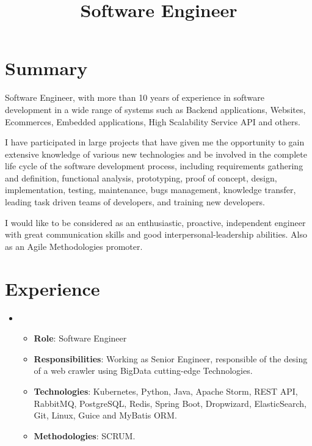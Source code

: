 \documentclass[11pt,a4paper,sans]{moderncv}        %
\title{Software Engineer}                               %
\begin{document}
\makecvtitle

\section{Summary}
Software Engineer, with more than 10 years of experience in software development in a wide range of systems 
such as Backend applications, Websites, Ecommerces, Embedded applications, High Scalability Service API and
others.

\medskip I have participated in large projects that have given me the opportunity to gain extensive knowledge of various new
technologies and be involved in the complete life cycle of the software development process, including requirements
gathering and definition, functional analysis, prototyping, proof of concept, design, implementation, testing,
maintenance, bugs management, knowledge transfer, leading task driven teams of developers, and training new
developers.

\medskip I would like to be considered as an enthusiastic, proactive, independent engineer with great communication skills
and good interpersonal-leadership abilities. Also as an Agile Methodologies promoter.

\section{Experience}
  {
    \begin{itemize}
      \item 
        \begin{itemize}
          \item \textbf{Role}: Software Engineer
          \item \textbf{Responsibilities}: Working as Senior Engineer, responsible of the desing of a web crawler using BigData cutting-edge Technologies. 
          \item \textbf{Technologies}: Kubernetes, Python, Java, Apache Storm, REST API, RabbitMQ, PostgreSQL, Redis, Spring Boot, Dropwizard, ElasticSearch, Git, Linux, Guice and MyBatis ORM.
          \item \textbf{Methodologies}: SCRUM.
        \end{itemize}
    \end{itemize}
  }
\end{document}
